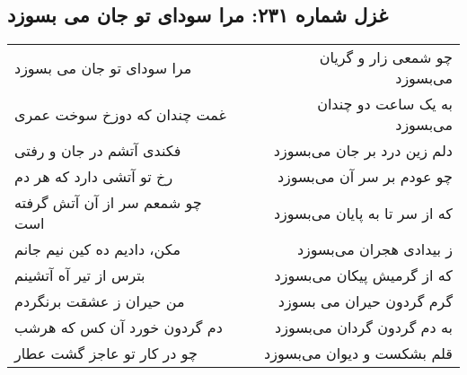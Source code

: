 \begin{center}
\section*{غزل شماره ۲۳۱: مرا سودای تو جان می بسوزد}
\label{sec:231}
\begin{longtable}{l p{0.5cm} r}
مرا سودای تو جان می بسوزد
&&
چو شمعی زار و گریان می‌بسوزد
\\
غمت چندان که دوزخ سوخت عمری
&&
به یک ساعت دو چندان می‌بسوزد
\\
فکندی آتشم در جان و رفتی
&&
دلم زین درد بر جان می‌بسوزد
\\
رخ تو آتشی دارد که هر دم
&&
چو عودم بر سر آن می‌بسوزد
\\
چو شمعم سر از آن آتش گرفته است
&&
که از سر تا به پایان می‌بسوزد
\\
مکن، دادیم ده کین نیم جانم
&&
ز بیدادی هجران می‌بسوزد
\\
بترس از تیر آه آتشینم
&&
که از گرمیش پیکان می‌بسوزد
\\
من حیران ز عشقت برنگردم
&&
گرم گردون حیران می بسوزد
\\
دم گردون خورد آن کس که هرشب
&&
به دم گردون گردان می‌بسوزد
\\
چو در کار تو عاجز گشت عطار
&&
قلم بشکست و دیوان می‌بسوزد
\\
\end{longtable}
\end{center}
